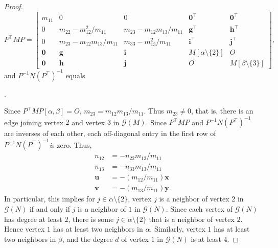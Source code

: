 \documentclass[10pt,a4paper]{amsart}
\newcommand{\G}{\mathcal{G}}
\begin{document}
\begin{proof}
\[ 
P^{\top}MP =
\left[ \begin{array}{ccc|c|c}
m_{11} & 0 & 0 & \mathbf 0^{\top} & \mathbf{0}^{\top}\\
0 & m_{22}-m_{12}^2/m_{11} & m_{23}-m_{12}m_{13}/m_{11} & \mathbf g^{\top} & \mathbf h^{\top} \\
0 & m_{23}-m_{12}m_{13}/m_{11} & m_{33}-m_{13}^2/m_{11}  & \mathbf i^{\top} & \mathbf j^{\top}  \\ \hline
\mathbf 0 & \mathbf g &\mathbf i &  M[\alpha\setminus \{2\} ] & O 
\\ \hline 
\mathbf 0 & \mathbf h & \mathbf j &  O & M[\beta\setminus \{ 3 \}] 
\end{array} \right] ,  
\] 
and 
$ P^{-1}N (P^{\top})^{-1} $
equals 
\begin{center}
.
\end{center}
Since $P^{\top} MP[\alpha , \beta]=O$, $m_{23}=m_{12}m_{13}/m_{11}$.  
Thus $m_{23} \neq 0$, that is,  there is an edge joining vertex $2$ and vertex $3$ in $\G(M)$. 
Since $P^{\top}MP$ and $P^{-1}N(P^{\top})^{-1}$ are inverses of each other, each off-diagonal entry in the first row of 
$P^{-1} N(P^{\top})^{-1}$\emph  is zero. 
Thus, 
\begin{align*}
n_{12}& =-n_{22}m_{12}/m_{11}\\
n_{13}&=-n_{33}m_{13}/m_{11}\\
\mathbf u& = -(m_{12}/m_{11}) \mathbf x \\ 
\mathbf v&= -(m_{13}/m_{11}) \mathbf y. 
\end{align*}
In particular, this implies for $j \in \alpha \setminus \{2\} $,  vertex  $j$ is a neighbor of vertex $2$ in $\G(N)$ if 
and only if $j$ is a neighbor of $1$ in $\G(N)$.
Since each vertex of $\G(N)$ has degree at least $2$, there is some $j \in \alpha \setminus \{2\} $ that  is a neighbor of vertex $2$. 
Hence vertex $1$ has at least two neighbors in $\alpha$. Similarly, vertex $1$ has at least two neighbors in $\beta$, and the degree $d$ 
of vertex $1$ in 
$\G(N)$ is at least $4$.



\end{proof}
\end{document}
